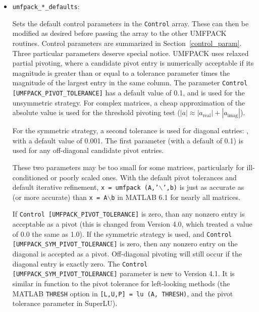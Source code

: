 \documentclass[11pt]{article}
\begin{document}
\begin{itemize}
\item {\tt umfpack\_*\_defaults}:

    Sets the default control parameters in the {\tt Control} array.  These can
    then be modified as desired before passing the array to the other UMFPACK
    routines.  Control parameters are summarized in Section~\ref{control_param}.
    Three particular parameters deserve special notice.
    UMFPACK uses relaxed partial pivoting, where a candidate pivot entry is
    numerically acceptable if its magnitude is greater than or equal to a
    tolerance parameter times the magnitude of the largest entry in the same
    column.  The parameter {\tt Control [UMFPACK\_PIVOT\_TOLERANCE]} has a
    default value of 0.1, and is used for the unsymmetric strategy.
    For complex matrices, a cheap approximation of the absolute value is
    used for the threshold pivoting test
    ($|a| \approx |a_{\mbox{real}}|+|a_{\mbox{imag}}|$).

    For the symmetric strategy, a second tolerance is used for diagonal
    entries: , with
    a default value of 0.001.  The first parameter (with a default of 0.1)
    is used for any off-diagonal candidate pivot entries.

    These two parameters may be too small for some matrices, particularly for
    ill-conditioned or poorly scaled ones.  With the default pivot tolerances
    and default iterative refinement,
        {\tt x = umfpack (A,'}$\backslash${\tt ',b)}
    is just as accurate as (or more accurate) than
        {\tt x = A}$\backslash${\tt b}
    in MATLAB 6.1 for nearly all matrices.

    If {\tt Control [UMFPACK\_PIVOT\_TOLERANCE]} is zero, than any
    nonzero entry is acceptable as a pivot (this is changed from Version 4.0,
    which treated a value of 0.0 the same as 1.0).  If the symmetric strategy is
    used, and {\tt Control [UMFPACK\_SYM\_PIVOT\_TOLERANCE]} is zero, then any
    nonzero entry on the diagonal is accepted as a pivot.  Off-diagonal pivoting
    will still occur if the diagonal entry is exactly zero.  The
    {\tt Control [UMFPACK\_SYM\_PIVOT\_TOLERANCE]} parameter is new to Version
    4.1.  It is similar in function to the pivot tolerance for left-looking
    methods (the MATLAB {\tt THRESH} option in {\tt [L,U,P] = lu (A, THRESH)},
    and the pivot tolerance parameter in SuperLU).


\end{itemize}
\end{document}

